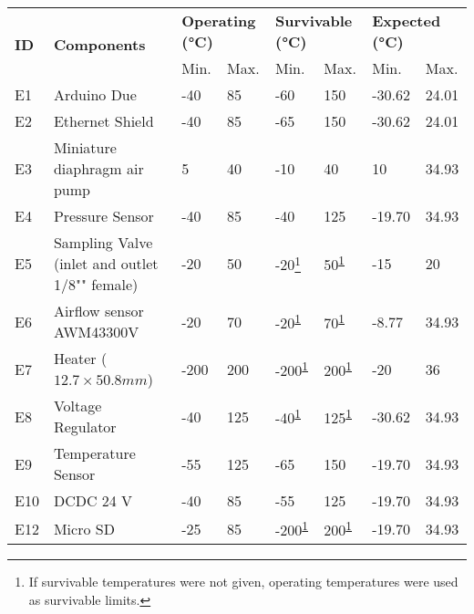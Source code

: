 



\begin{longtable}{|m{1cm}|m{3.5cm}|m{1.3cm}|m{1.3cm}|m{1.4cm}|m{1.3cm}|m{1.3cm}|m{1.3cm}|}
\hline
\multirow{2}{*}{\textbf{ID}} & \multirow{2}{*}{\textbf{Components}}                                 & \multicolumn{2}{l|}{\textbf{Operating (°C)}} & \multicolumn{2}{l|}{\textbf{Survivable (°C)}} & \multicolumn{2}{l|}{\textbf{Expected (°C)}} \\ \cline{3-8} &   & Min.  & Max.  & Min.  & Max.  &  Min.   &  Max.            \\ \hline
E1 & Arduino Due & -40 & 85 & -60 & 150 & -30.62 & 24.01 \\ \hline
E2 & Ethernet Shield & -40 & 85 & -65 & 150 & -30.62 & 24.01 \\ \hline
E3 & Miniature diaphragm air pump & 5 & 40 & -10 & 40 & 10 & 34.93 \\ \hline
E4 & Pressure Sensor & -40 & 85 & -40 & 125 & -19.70 & 34.93 \\ \hline
E5 & Sampling Valve (inlet and outlet 1/8"" female) & -20 & 50 & -20\footnote{If survivable temperatures were not given, operating temperatures were used as survivable limits.\label{fn:erik}} & 50\textsuperscript{\ref{fn:erik}} & -15 & 20 \\ \hline
E6 & Airflow sensor AWM43300V & -20 & 70 & -20\textsuperscript{\ref{fn:erik}} & 70\textsuperscript{\ref{fn:erik}} & -8.77 & 34.93 \\ \hline
E7 & Heater ($12.7\times 50.8 mm$) & -200 & 200 & -200\textsuperscript{\ref{fn:erik}} & 200\textsuperscript{\ref{fn:erik}} & -20 & 36 \\ \hline
E8 & Voltage Regulator & -40 & 125 & -40\textsuperscript{\ref{fn:erik}} & 125\textsuperscript{\ref{fn:erik}} & -30.62 & 34.93 \\ \hline
E9 & Temperature Sensor & -55 & 125 & -65 & 150 & -19.70 & 34.93 \\ \hline
E10 & DCDC 24 V & -40 & 85 & -55 & 125 & -19.70 & 34.93 \\ \hline
E12 & Micro SD & -25 & 85 & -200\textsuperscript{\ref{fn:erik}} & 200\textsuperscript{\ref{fn:erik}} & -19.70 & 34.93 \\ \hline

\end{longtable}
